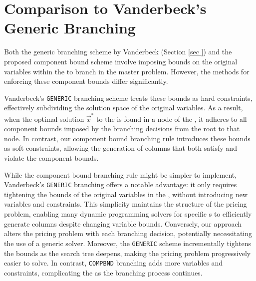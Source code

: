 \section{Comparison to Vanderbeck's Generic Branching}\label{sec:cmpbnd_simdif}
Both the generic branching scheme by Vanderbeck (Section \ref{sec
}) and the proposed component bound scheme involve imposing bounds on the original variables within the \SP{} to branch in the master problem. However, the methods for enforcing these component bounds differ significantly.

Vanderbeck's \texttt{GENERIC} branching scheme treats these bounds as hard constraints, effectively subdividing the solution space of the original variables. As a result, when the optimal solution $\vec{x}^*$ to the \IP{} is found in a node of the \RMP{}, it adheres to all component bounds imposed by the branching decisions from the root to that node. In contrast, our component bound branching rule introduces these bounds as soft constraints, allowing the generation of columns that both satisfy and violate the component bounds.

While the component bound branching rule might be simpler to implement, Vanderbeck's \texttt{GENERIC} branching offers a notable advantage: it only requires tightening the bounds of the original variables in the \SP{}, without introducing new variables and constraints. This simplicity maintains the structure of the pricing problem, enabling many dynamic programming solvers for specific \IP{}s to efficiently generate columns despite changing variable bounds. Conversely, our approach alters the pricing problem with each branching decision, potentially necessitating the use of a generic \MIP{} solver. Moreover, the \texttt{GENERIC} scheme incrementally tightens the bounds as the search tree deepens, making the pricing problem progressively easier to solve. In contrast, \texttt{COMPBND} branching adds more variables and constraints, complicating the \SP{} as the branching process continues.

